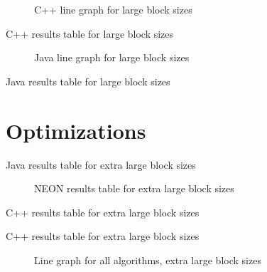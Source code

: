 \begin{figure}
    \centering
    
    \caption{C++ line graph for large block sizes}
    \label{fig:cpp:line:large}
\end{figure}
\begin{table}
    \centering
    \caption{C++ results table for large block sizes}
    \label{tab:cpp:large}
    \resizebox{\columnwidth}{!}{
        
    }
\end{table}


\begin{figure}
    \centering
    
    \caption{Java line graph for large block sizes}
    \label{fig:java:line:large}
\end{figure}
\begin{table}
    \centering
    \caption{Java results table for large block sizes}
    \label{tab:java:large}
    
\end{table}





\section{Optimizations}

\begin{table}
    \centering
    \caption{Java results table for extra large block sizes}
    \label{tab:java:extra}
    
\end{table}

\begin{figure}
    \centering
    
    \caption{NEON results table for extra large block sizes}
    \label{fig:neon:line:extra}
\end{figure}

\begin{table}
    \centering
    
    \caption{C++ results table for extra large block sizes}
    \label{tab:cpp:extra}
\end{table}

\begin{table}
    \centering
    \resizebox{\columnwidth}{!}{
        
    }
    \caption{C++ results table for extra large block sizes}
    \label{tab:cpp:extra}
\end{table}

\begin{figure}
    \centering
    
    \caption{Line graph for all algorithms, extra large block sizes}
    \label{fig:all:line:extra}
\end{figure}

